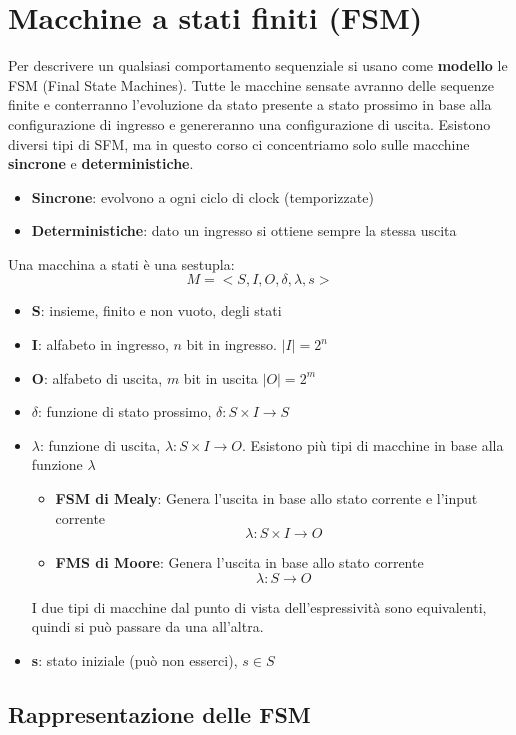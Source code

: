\documentclass[a4paper]{article}
\theoremstyle{break}
\theoremstyle{break}
\theoremstyle{break}
\theoremstyle{break}
\begin{document}
\section{Macchine a stati finiti (FSM)}
Per descrivere un qualsiasi comportamento sequenziale si usano come \textbf{modello}
le FSM (Final State Machines).
Tutte le macchine sensate avranno delle sequenze finite e conterranno l'evoluzione da
stato presente a stato prossimo in base alla configurazione di ingresso e genereranno una
configurazione di uscita. Esistono diversi tipi di SFM, ma in questo corso ci
concentriamo solo sulle macchine \textbf{sincrone} e \textbf{deterministiche}.
\begin{itemize}
  \item \textbf{Sincrone}: evolvono a ogni ciclo di clock (temporizzate) 
  \item \textbf{Deterministiche}: dato un ingresso si ottiene sempre la stessa uscita
\end{itemize}
Una macchina a stati è una sestupla: 
\[
M=<S,I,O,\delta,\lambda,s>
\] 
\begin{itemize}
  \item \textbf{S}: insieme, finito e non vuoto, degli stati
  \item \textbf{I}: alfabeto in ingresso, \( n \) bit in ingresso. \( |I|=2^n \) 
  \item \textbf{O}: alfabeto di uscita, \( m \)  bit in uscita \( |O|=2^m \)
  \item \textbf{\(\delta\)}: funzione di stato prossimo, \( \delta: S \times I \to S \)
  \item \textbf{\(\lambda\)}: funzione di uscita, \( \lambda: S \times I \to O \). Esistono
    più tipi di macchine in base alla funzione \( \lambda \) 
    \begin{itemize}
      \item \textbf{FSM di Mealy}: Genera l'uscita in base allo stato corrente e l'input corrente \[ \lambda: S \times I \to O \]
      \item \textbf{FMS di Moore}: Genera l'uscita in base allo stato corrente \[ \lambda: S \to O \]
    \end{itemize}
    I due tipi di macchine dal punto di vista dell'espressività sono equivalenti, quindi
    si può passare da una all'altra.
  \item \textbf{s}: stato iniziale (può non esserci), \( s \in S \)
\end{itemize}

\subsection{Rappresentazione delle FSM}
\end{document}
